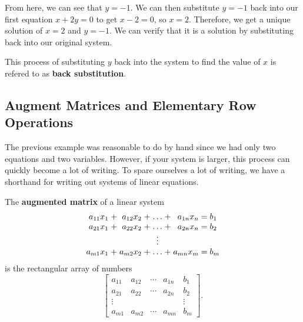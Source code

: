 \begin{example}
\begin{minipage}{0.35\textwidth}
	\end{minipage}
	\begin{minipage}{0.25\textwidth}
		\phantom{a}
	\end{minipage}
	
	\vspace{10pt}
	
	From here, we can see that $y = -1$. We can then substitute $y = -1$ back into our first equation $x + 2y = 0$ to get $x - 2 = 0$, so $x = 2$. Therefore, we get a unique solution of $x = 2$ and $y = -1$. We can verify that it is a solution by substituting back into our original system.

	

\end{example}

This process of substituting $y$ back into the system to find the value of $x$ is refered to as \textbf{back substitution}.

\subsection*{Augment Matrices and Elementary Row Operations}

The previous example was reasonable to do by hand since we had only two equations and two variables. However, if your system is larger, this process can quickly become a lot of writing. To spare ourselves a lot of writing, we have a shorthand for writing out systems of linear equations.

\begin{definition}
	The \textbf{augmented matrix} of a linear system
	\[
	\arraycolsep=1.4pt
	\begin{array}{rcrcccrl}
		a_{11} x_1 &+& a_{12}x_2& +& \dots &+& a_{1n}x_n 	&= b_1\\
		a_{21} x_1 &+& a_{22}x_2& +& \dots &+& a_{2n}x_n 	&= b_2\\
				&	&		&	& \vdots &	&	&	\\
		a_{m1}x_1& +& a_{m2}x_2 &+& \dots &+& a_{mn}x_m &= b_m
	\end{array}
	\]
	is the rectangular array of numbers
	$$\begin{bmatrix}
		a_{11} & a_{12} & \cdots & a_{1n} & b_1\\
		a_{21} & a_{22} & \cdots & a_{2n} & b_2\\
		\vdots &  & & & \vdots\\
		a_{m1} & a_{m2} & \cdots & a_{mn} & b_m
	\end{bmatrix}.$$

\end{definition}

